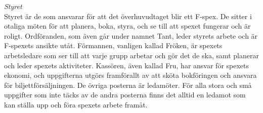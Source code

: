 {\Large\textit{Styret}} \\
Styret är de som ansvarar för att det överhuvudtaget blir ett F-spex. De sitter i otaliga möten för att planera, boka, styra, och se till att spexet fungerar och är roligt. 
Ordföranden, som även går under namnet Tant, leder styrets arbete och är F-spexets ansikte utåt. 
Förmannen, vanligen kallad Fröken, är spexets arbetsledare som ser till att varje grupp arbetar och gör det de ska, samt planerar och leder spexets aktiviteter. 
Kassören, även kallad Fru, har ansvar för spexets ekonomi, och uppgifterna utgörs framförallt av att sköta bokföringen och ansvara för biljettförsäljningen. 
De övriga posterna är ledamöter. För alla stora och små uppgifter som inte täcks av de andra posterna finns det alltid en ledamot som kan ställa upp och föra spexets arbete framåt.


\endgroup